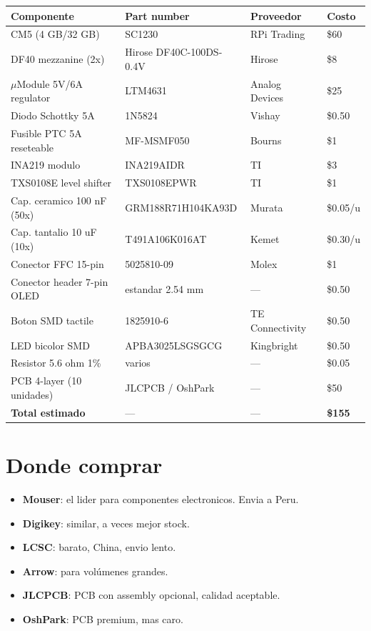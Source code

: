 \documentclass[11pt,a4paper,oneside,openright]{book}
\begin{document}
\begin{center}
\small
\begin{tabular}{p{4.5cm}p{4cm}p{3cm}p{1.5cm}}
\toprule
\textbf{Componente} & \textbf{Part number} & \textbf{Proveedor} & \textbf{Costo} \\
\midrule
CM5 (4 GB/32 GB)              & SC1230               & RPi Trading & \$60 \\
DF40 mezzanine (2x)            & Hirose DF40C-100DS-0.4V & Hirose      & \$8 \\
$\mu$Module 5V/6A regulator    & LTM4631              & Analog Devices & \$25 \\
Diodo Schottky 5A              & 1N5824               & Vishay      & \$0.50 \\
Fusible PTC 5A reseteable      & MF-MSMF050           & Bourns      & \$1 \\
INA219 modulo                  & INA219AIDR            & TI          & \$3 \\
TXS0108E level shifter         & TXS0108EPWR           & TI          & \$1 \\
Cap. ceramico 100 nF (50x)     & GRM188R71H104KA93D    & Murata      & \$0.05/u \\
Cap. tantalio 10 uF (10x)      & T491A106K016AT        & Kemet       & \$0.30/u \\
Conector FFC 15-pin            & 5025810-09           & Molex       & \$1 \\
Conector header 7-pin OLED      & estandar 2.54 mm     & ---         & \$0.50 \\
Boton SMD tactile              & 1825910-6             & TE Connectivity & \$0.50 \\
LED bicolor SMD                & APBA3025LSGSGCG       & Kingbright  & \$0.50 \\
Resistor 5.6 ohm 1\%           & varios               & ---         & \$0.05 \\
PCB 4-layer (10 unidades)      & JLCPCB / OshPark      & ---         & \$50 \\
\midrule
\textbf{Total estimado}        & --- & --- & \textbf{\$155} \\
\bottomrule
\end{tabular}
\end{center}

\section{Donde comprar}

\begin{itemize}[leftmargin=2em]
  \item \textbf{Mouser}: el lider para componentes electronicos. Envia a Peru.
  \item \textbf{Digikey}: similar, a veces mejor stock.
  \item \textbf{LCSC}: barato, China, envio lento.
  \item \textbf{Arrow}: para vol\'umenes grandes.
  \item \textbf{JLCPCB}: PCB con assembly opcional, calidad aceptable.
  \item \textbf{OshPark}: PCB premium, mas caro.
\end{itemize}
\end{document}
